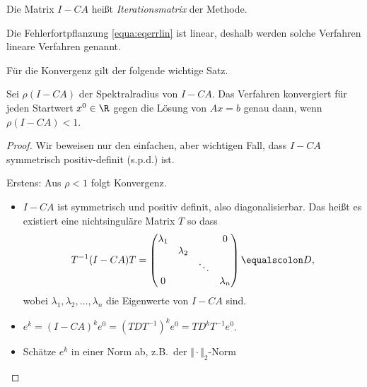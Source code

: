 \begin{definition}
 Die Matrix $I - CA$ heißt \emph{Iterationsmatrix} der Methode.
\end{definition}


Die Fehlerfortpflanzung \eqref{equa:eqerrlin} ist linear, deshalb werden solche Verfahren lineare Verfahren genannt.

\bigskip

Für die Konvergenz gilt der folgende wichtige Satz.
\begin{satz}
Sei $\rho (I-CA)$ der Spektralradius von $I-CA$. Das Verfahren konvergiert für jeden Startwert $x^0 \in \R$ gegen die Lösung von $Ax=b$ genau dann, wenn $\rho(I-CA)<1$.
\end{satz}
\begin{proof}
Wir beweisen nur den einfachen, aber wichtigen Fall, dass $I-CA$ symmetrisch positiv-definit (s.p.d.) ist.

\noindent
Erstens: Aus $\rho<1$ folgt Konvergenz.
\begin{itemize}
 \item $I-CA$ ist symmetrisch und positiv definit, also diagonalisierbar.
  Das heißt es existiert eine nichtsinguläre Matrix $T$ so dass
	\begin{equation*}
	 T^{-1}(I-CA)T=\begin{pmatrix}
				\lambda_1 & & & 0 \\
				& \lambda_2 & & \\
				& & \ddots & \\
				0 & & & \lambda_n
			\end{pmatrix} \equalscolon D,
		\end{equation*}
		wobei $\lambda_1,\lambda_2,\ldots,\lambda_n$ die Eigenwerte von $I-CA$ sind.
	\item $e^k=(I-CA)^ke^0=\left(TDT^{-1} \right)^ke^0=TD^kT^{-1}e^0$.
	\item
	Schätze $e^k$ in einer Norm ab, z.B.\ der $\Vert \cdot \Vert_2$-Norm


\end{itemize}
\end{proof}
